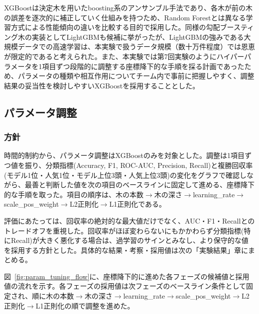 \documentclass[dvipdfmx, a4paper, 11pt, titlepage]{jsarticle}
\begin{document}
XGBoostは決定木を用いたboosting系のアンサンブル手法であり、各木が前の木の誤差を逐次的に補正していく仕組みを持つため、Random Forestとは異なる学習方式による性能傾向の違いを比較する目的で採用した。同様の勾配ブースティング木の実装としてLightGBMも候補に挙がったが、LightGBMの強みである大規模データでの高速学習は、本実験で扱うデータ規模（数十万件程度）では恩恵が限定的であると考えられた。また、本実験では第7回実験のようにハイパーパラメータを1項目ずつ段階的に調整する座標降下的な手順を採る計画であったため、パラメータの種類や相互作用についてチーム内で事前に把握しやすく、調整結果の妥当性を検討しやすいXGBoostを採用することとした。


\subsection{パラメータ調整}

\subsubsection{方針}

時間的制約から、パラメータ調整はXGBoostのみを対象とした。調整は1項目ずつ値を振り、分類指標(Accuracy, F1, ROC-AUC, Precision, Recall)と複勝回収率(モデル1位・人気1位・モデル上位3頭・人気上位3頭)の変化をグラフで確認しながら、最善と判断した値を次の項目のベースラインに固定して進める、座標降下的な手順を取った。項目の順序は、木の本数$\to$木の深さ$\to$learning\_rate$\to$scale\_pos\_weight$\to$L2正則化$\to$L1正則化である。

評価にあたっては、回収率の絶対的な最大値だけでなく、AUC・F1・Recallとのトレードオフを重視した。回収率がほぼ変わらないにもかかわらず分類指標(特にRecall)が大きく悪化する場合は、過学習のサインとみなし、より保守的な値を採用する方針とした。具体的な結果・考察・採用値は次の「実験結果」章にまとめる。

図~\ref{fig:param_tuning_flow}に、座標降下的に進めた各フェーズの候補値と採用値の流れを示す。各フェーズの採用値は次フェーズのベースライン条件として固定され、順に木の本数$\to$木の深さ$\to$learning\_rate$\to$scale\_pos\_weight$\to$L2正則化$\to$L1正則化の順で調整を進めた。
\end{document}
